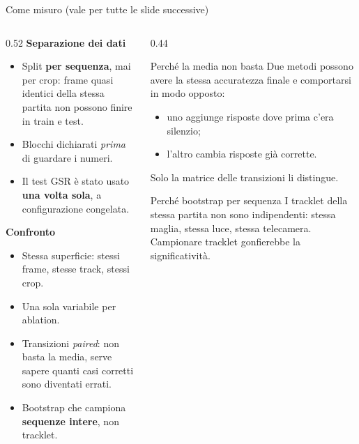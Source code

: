 \documentclass[aspectratio=169,10pt]{beamer}
\begin{document}
\begin{frame}{Come misuro (vale per tutte le slide successive)}
  \begin{columns}[T]
    \begin{column}{0.52\textwidth}
      \small
      \textbf{Separazione dei dati}
      \begin{itemize}\small
        \item Split \textbf{per sequenza}, mai per crop: frame quasi identici
              della stessa partita non possono finire in train e test.
        \item Blocchi dichiarati \emph{prima} di guardare i numeri.
        \item Il test GSR è stato usato \textbf{una volta sola}, a
              configurazione congelata.
      \end{itemize}
      \vspace{0.5em}
      \textbf{Confronto}
      \begin{itemize}\small
        \item Stessa superficie: stessi frame, stesse track, stessi crop.
        \item Una sola variabile per ablation.
        \item Transizioni \emph{paired}: non basta la media, serve sapere
              quanti casi corretti sono diventati errati.
        \item Bootstrap che campiona \textbf{sequenze intere}, non tracklet.
      \end{itemize}
    \end{column}
    \begin{column}{0.44\textwidth}
      \footnotesize
      \begin{block}{Perché la media non basta}
        Due metodi possono avere la stessa accuratezza finale e comportarsi in
        modo opposto:
        \begin{itemize}\footnotesize
          \item uno aggiunge risposte dove prima c'era silenzio;
          \item l'altro cambia risposte già corrette.
        \end{itemize}
        Solo la matrice delle transizioni li distingue.
      \end{block}
      \begin{block}{Perché bootstrap per sequenza}
        I tracklet della stessa partita non sono indipendenti: stessa maglia,
        stessa luce, stessa telecamera. Campionare tracklet gonfierebbe la
        significatività.
      \end{block}
    \end{column}
  \end{columns}
\end{frame}
\end{document}
